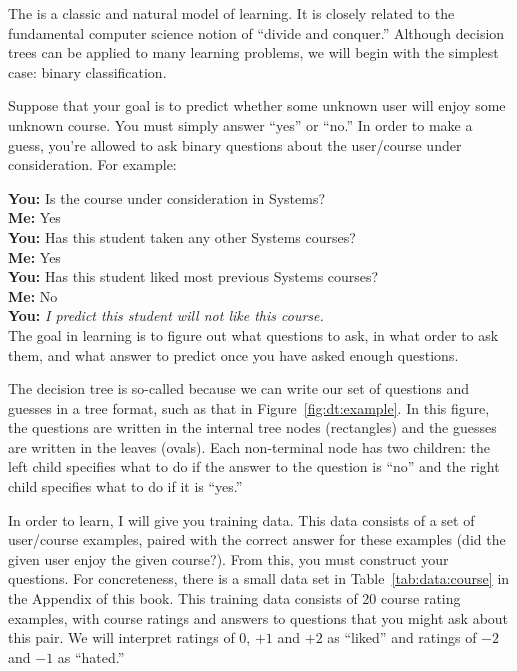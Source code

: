The  is a classic and natural model of
learning.  It is closely related to the fundamental computer science
notion of ``divide and conquer.''  Although decision trees can be
applied to many learning problems, we will begin with the simplest
case: binary classification.

Suppose that your goal is to predict whether some unknown user will
enjoy some unknown course.  You must simply answer ``yes'' or ``no.''
In order to make a guess, you're allowed to ask binary questions
about the user/course under consideration.  For example:

{\bf You:} Is the course under consideration in Systems?\\
{\bf Me:}  Yes\\
{\bf You:} Has this student taken any other Systems courses?\\
{\bf Me:}  Yes\\
{\bf You:} Has this student liked most previous Systems courses?\\
{\bf Me:}  No\\
{\bf You:} \emph{I predict this student will not like this course.}\\

The goal in learning is to figure out what questions to ask, in what
order to ask them, and what answer to predict once you have asked
enough questions.


\MoveNextFigure{-10cm}

The decision tree is so-called because we can write our set of
questions and guesses in a tree format, such as that in
Figure~\ref{fig:dt:example}.  In this figure, the questions are
written in the internal tree nodes (rectangles) and the guesses are
written in the leaves (ovals).  Each non-terminal node has two
children: the left child specifies what to do if the answer to the
question is ``no'' and the right child specifies what to do if it is
``yes.''

In order to learn, I will give you training data.  This data consists
of a set of user/course examples, paired with the correct answer for
these examples (did the given user enjoy the given course?).  From
this, you must construct your questions.  For concreteness, there is a
small data set in Table~\ref{tab:data:course} in the Appendix of this
book.  This training data consists of 20 course rating examples, with
course ratings and answers to questions that you might ask about this
pair.  We will interpret ratings of $0$, $+1$ and $+2$ as ``liked'' and
ratings of $-2$ and $-1$ as ``hated.''

